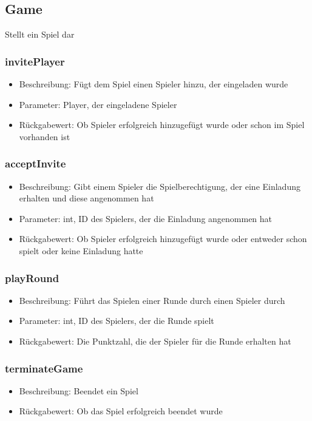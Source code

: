 \documentclass[a4paper]{scrreprt}
\begin{document}
   \subsection{Game}
   Stellt ein Spiel dar
   \subsubsection{invitePlayer}
   \begin{itemize}
           \item Beschreibung: Fügt dem Spiel einen Spieler hinzu, der eingeladen wurde
           \item Parameter: Player, der eingeladene Spieler
           \item Rückgabewert: Ob Spieler erfolgreich hinzugefügt wurde oder schon im Spiel vorhanden ist
   \end{itemize}
   \subsubsection{acceptInvite}
   \begin{itemize}
              \item Beschreibung: Gibt einem Spieler die Spielberechtigung, der eine Einladung erhalten und diese angenommen hat
              \item Parameter: int, ID des Spielers, der die Einladung angenommen hat
              \item Rückgabewert: Ob Spieler erfolgreich hinzugefügt wurde oder entweder schon spielt oder keine Einladung hatte
   \end{itemize}
   \subsubsection{playRound}
   \begin{itemize}
              \item Beschreibung: Führt das Spielen einer Runde durch einen Spieler durch
              \item Parameter: int, ID des Spielers, der die Runde spielt
              \item Rückgabewert: Die Punktzahl, die der Spieler für die Runde erhalten hat
   \end{itemize}
   \subsubsection{terminateGame}
   \begin{itemize}
           \item Beschreibung: Beendet ein Spiel
           \item Rückgabewert: Ob das Spiel erfolgreich beendet wurde
   \end{itemize}
\end{document}
